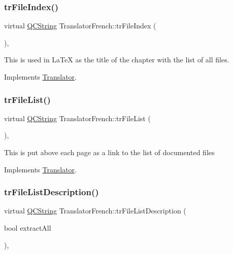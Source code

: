 \subsubsection{\texorpdfstring{trFileIndex()}{trFileIndex()}}
{\footnotesize\ttfamily virtual \mbox{\hyperlink{class_q_c_string}{Q\+C\+String}} Translator\+French\+::tr\+File\+Index (\begin{DoxyParamCaption}{ }\end{DoxyParamCaption})\hspace{0.3cm}{\ttfamily [inline]}, {\ttfamily [virtual]}}

This is used in La\+TeX as the title of the chapter with the list of all files. 

Implements \mbox{\hyperlink{class_translator}{Translator}}.

\mbox{\label{class_translator_french_adc8dccbbaf6684512ae5fdf2d25e9408}} 
\subsubsection{\texorpdfstring{trFileList()}{trFileList()}}
{\footnotesize\ttfamily virtual \mbox{\hyperlink{class_q_c_string}{Q\+C\+String}} Translator\+French\+::tr\+File\+List (\begin{DoxyParamCaption}{ }\end{DoxyParamCaption})\hspace{0.3cm}{\ttfamily [inline]}, {\ttfamily [virtual]}}

This is put above each page as a link to the list of documented files 

Implements \mbox{\hyperlink{class_translator}{Translator}}.

\mbox{\label{class_translator_french_ad020221dbf1ba15d73adb06458bd473b}} 
\subsubsection{\texorpdfstring{trFileListDescription()}{trFileListDescription()}}
{\footnotesize\ttfamily virtual \mbox{\hyperlink{class_q_c_string}{Q\+C\+String}} Translator\+French\+::tr\+File\+List\+Description (\begin{DoxyParamCaption}\item[{bool}]{extract\+All }\end{DoxyParamCaption})\hspace{0.3cm}{\ttfamily [inline]}, {\ttfamily [virtual]}}

